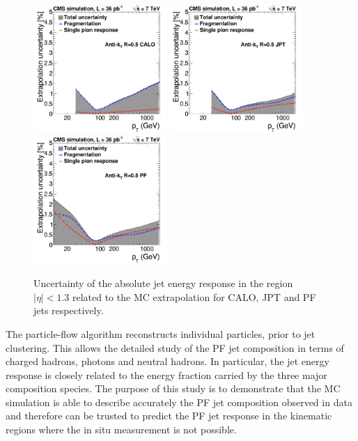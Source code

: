 \begin{figure}[ht!]
  \begin{center}
    \includegraphics[width=0.45\textwidth]{Figures/JEC/JECUncert_HighPt_CALOAK5}
    \includegraphics[width=0.45\textwidth]{Figures/JEC/JECUncert_HighPt_JPTAK5}
    \includegraphics[width=0.45\textwidth]{Figures/JEC/JECUncert_HighPt_PFAK5}
    \caption{Uncertainty of the absolute jet energy response in the region $|\eta|<1.3$ related to the MC extrapolation for CALO, JPT and PF jets respectively. }
    \label{fig:highptUnc}
  \end{center}
\end{figure}

The particle-flow algorithm reconstructs individual particles, prior to jet clustering. This allows the detailed study of the PF jet composition in terms of charged hadrons, photons and neutral hadrons. In particular, the jet energy response is closely related to the energy fraction carried by the three major composition species. The purpose of this study is to demonstrate that the MC simulation is able to describe accurately the PF jet composition observed in data and therefore can be trusted to predict the PF jet response in the kinematic regions where the in situ measurement is not possible.


